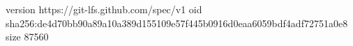 version https://git-lfs.github.com/spec/v1
oid sha256:de4d70bb90a89a10a389d155109e57f445b0916d0eaa6059bdf4adf72751a0e8
size 87560
